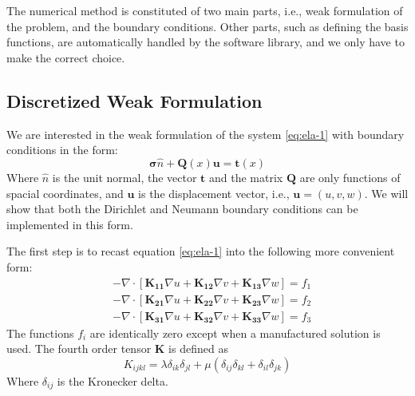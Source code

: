 \documentclass[letter,12pt]{article}
\newcommand*{\hvec}[1]{\mathbf{#1}}
\newcommand*{\hmat}[1]{\mathbf{#1}}
\begin{document}
The numerical method is constituted of two main parts, i.e., weak
formulation of the problem, and the boundary conditions. Other parts,
such as defining the basis functions, are automatically handled by the
software library, and we only have to make the correct choice.

\subsection*{Discretized Weak Formulation}

We are interested in the weak formulation of the system
\eqref{eq:ela-1} with boundary conditions in the form:
%
\begin{equation}
\label{eq:bdry-1}
\hmat{\sigma} \hat{n} + \hmat{Q}(x) \hvec{u} = \hvec{t}(x)
\end{equation}
% 
Where $\hat{n}$ is the unit normal, the vector $\hvec{t}$ and the
matrix $\hvec{Q}$ are only functions of spacial coordinates, and
$\hvec{u}$ is the displacement vector, i.e., $\hvec{u} = (u,v,w)$. We
will show that both the Dirichlet and Neumann boundary conditions can
be implemented in this form.

The first step is to recast equation \eqref{eq:ela-1} into the
following more convenient form:
%
\begin{equation}
  \begin{aligned}
    \label{eq:ela-2}
    &-\nabla \cdot \left[
      \hmat{K_{11}} \nabla u + 
      \hmat{K_{12}} \nabla v + 
      \hmat{K_{13}} \nabla w  
      \right]  = f_1
    \\
    &-\nabla \cdot \left[
      \hmat{K_{21}} \nabla u + 
      \hmat{K_{22}} \nabla v + 
      \hmat{K_{23}} \nabla w  
      \right]  = f_2
    \\
    &-\nabla \cdot \left[
      \hmat{K_{31}} \nabla u + 
      \hmat{K_{32}} \nabla v + 
      \hmat{K_{33}} \nabla w  
      \right]  = f_3
  \end{aligned}
\end{equation}
%
The functions $f_i$ are identically zero except when a manufactured
solution is used. The fourth order tensor $\hmat{K}$ is defined as 
\[
K_{ijkl} = \lambda \delta_{ik} \delta_{jl} + 
\mu ( \delta_{ij}\delta_{kl} + \delta_{il}\delta_{jk} )
\]
%
Where $\delta_{ij}$ is the Kronecker delta.

\end{document}

